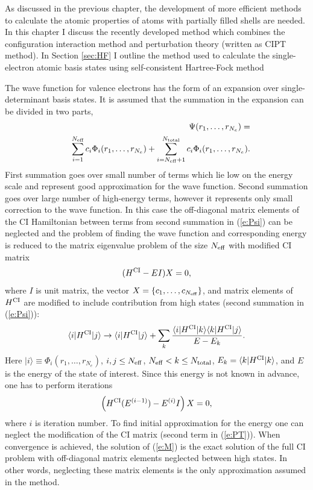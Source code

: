 \documentclass[10pt,a4paper, twoside, openright]{report}
\begin{document}
As discussed in the previous chapter, the development of more efficient methods to calculate the atomic properties of atoms with partially filled shells are needed. In this chapter I discuss the recently developed method which combines the configuration interaction method and perturbation theory (written as CIPT method). In Section \ref{sec:HF} I outline the method used to calculate the single-electron atomic basis states using self-consistent Hartree-Fock method



The wave function for valence electrons has the form of an expansion over single-determinant 
basis states. It is assumed that the summation in the expansion can be divided in two parts,
\begin{eqnarray}
&&\Psi(r_1,\dots,r_{N_e}) = \label{e:Psi} \\
&& \sum_{i=1}^{N_{\rm eff}} c_{i} \Phi_i(r_1,\dots,r_{N_e}) + \sum_{i=N_{\rm eff}+1}^{N_{\rm total}} c_{i} \Phi_i(r_1,\dots,r_{N_e}).
\nonumber
\end{eqnarray}
First summation goes over small number of terms which lie low on the energy scale 
and represent good approximation for the wave function.
Second summation goes over large number of high-energy terms, however it represents only 
small correction to the wave function.
In this case the off-diagonal matrix elements of the CI Hamiltonian between terms from second summation in (\ref{e:Psi})
can be neglected and the problem of finding the wave function and corresponding energy is reduced to the 
matrix eigenvalue problem of the size $N_{\rm eff}$ with modified CI matrix
\begin{equation}
(H^{\rm CI} - EI)X=0,
\label{e:M}
\end{equation}
where $I$ is unit matrix, the vector $X = \{c_1, \dots, c_{N_{\rm eff}}\}$, and matrix elements of $H^{\rm CI}$ are modified 
to include contribution from high states (second summation in (\ref{e:Psi})):
\begin{equation}
\langle i|H^{\rm CI}|j\rangle \rightarrow \langle i|H^{\rm CI}|j\rangle + 
\sum_k \frac{\langle i|H^{\rm CI}|k\rangle\langle k|H^{\rm
    CI}|j\rangle}{E - E_k}. 
\label{e:PT}
\end{equation}
Here $|i\rangle \equiv \Phi_i(r_1,\dots,r_{N_e})$,  $i,j \le N_{\rm eff}$, $N_{\rm eff} < k \le N_{\rm total}$,  
$E_k = \langle k|H^{\rm CI}|k\rangle$, and $E$ is the energy of the state of interest.
Since this energy is not known in advance, one has to perform iterations
\begin{equation}
\left(H^{\rm CI}(E^{(i-1)}) - E^{(i)}I\right)X=0,
\label{e:Mi}
\end{equation}
where $i$ is iteration number. To find initial approximation for the energy one can neglect the modification of the CI
matrix (second term in (\ref{e:PT})). When convergence is achieved, the solution of (\ref{e:M}) is the exact solution of the 
full CI problem with off-diagonal matrix elements neglected between high states. In other words, neglecting these
matrix elements is the only approximation assumed in the method.
\end{document}
